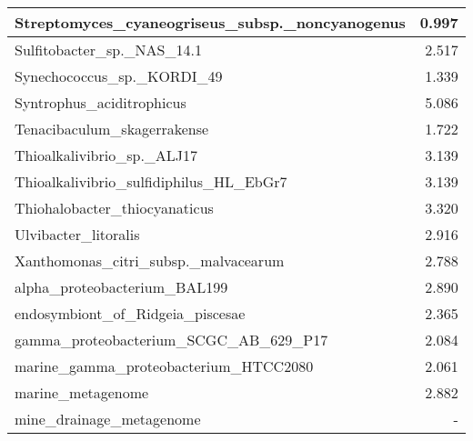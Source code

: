\documentclass[12pt,a4paper]{article}
\begin{document}
\begin{table}[ht]
\begin{center}
\begin{tabular}{|l*{1}{|r}|}
Streptomyces\_cyaneogriseus\_subsp.\_noncyanogenus & 0.997 \\ \hline
Sulfitobacter\_sp.\_NAS\_14.1 & 2.517 \\ \hline
Synechococcus\_sp.\_KORDI\_49 & 1.339 \\ \hline
Syntrophus\_aciditrophicus & 5.086 \\ \hline
Tenacibaculum\_skagerrakense & 1.722 \\ \hline
Thioalkalivibrio\_sp.\_ALJ17 & 3.139 \\ \hline
Thioalkalivibrio\_sulfidiphilus\_HL\_EbGr7 & 3.139 \\ \hline
Thiohalobacter\_thiocyanaticus & 3.320 \\ \hline
Ulvibacter\_litoralis & 2.916 \\ \hline
Xanthomonas\_citri\_subsp.\_malvacearum & 2.788 \\ \hline
alpha\_proteobacterium\_BAL199 & 2.890 \\ \hline
endosymbiont\_of\_Ridgeia\_piscesae & 2.365 \\ \hline
gamma\_proteobacterium\_SCGC\_AB\_629\_P17 & 2.084 \\ \hline
marine\_gamma\_proteobacterium\_HTCC2080 & 2.061 \\ \hline
marine\_metagenome & 2.882 \\ \hline
mine\_drainage\_metagenome & - \\ \hline
\end{tabular}
\end{center}
\end{table}
\end{document}
